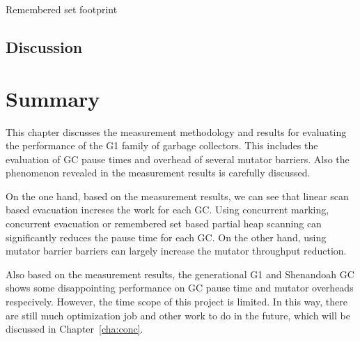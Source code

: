 \begin{table*}
  \centering
  
  \caption{Remembered set footprint}
  \label{tab:remsetfootprint}
\end{table*}

\subsection{Discussion}

\section{Summary} %
\label{sec:summary}

This chapter discusses the measurement methodology and results for evaluating the
performance of the G1 family of garbage collectors. This includes the evaluation of
GC pause times and overhead of several mutator barriers. Also the phenomenon revealed
in the measurement results is carefully discussed.

On the one hand, based on the measurement results, we can see that linear scan based evacuation
increses the work for each GC. Using concurrent marking, concurrent evacuation
or remembered set based partial heap scanning can significantly reduces the pause time
for each GC. On the other hand, using mutator barrier barriers can largely increase the
mutator throughput reduction.

Also based on the measurement results, the generational G1 and Shenandoah GC shows some
disappointing performance on GC pause time and mutator overheads respecively.
However, the time scope of this project is limited.
In this way, there are still much optimization job and other work to do in the future,
which will be discussed in Chapter~\ref{cha:conc}.







%   

